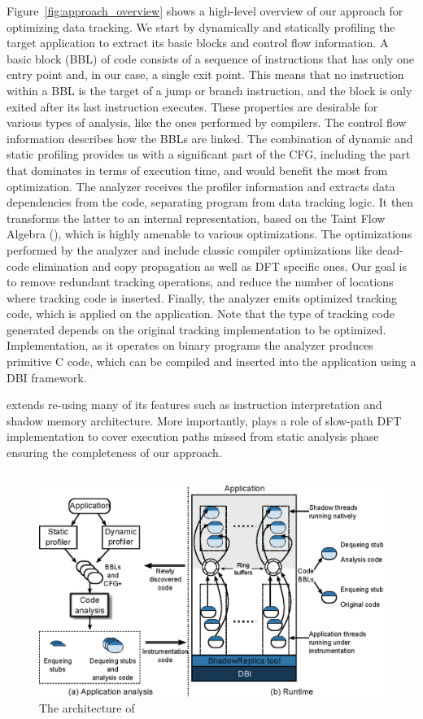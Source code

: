 Figure~\ref{fig:approach_overview} shows a high-level overview of our approach
for optimizing data tracking. We start by dynamically and statically profiling
the target application to extract its basic blocks and control flow
information. A basic block (BBL) of code consists of a sequence of instructions
that has only one entry point and, in our case, a single exit point. This means
that no instruction within a BBL is the target of a jump or branch instruction,
and the block is only exited after its last instruction executes. These
properties are desirable for various types of analysis, like the ones performed
by compilers. The control flow information describes how the BBLs are linked.
The combination of dynamic and static profiling provides us with a significant
part of the CFG, including the part that dominates in terms of execution time,
and would benefit the most from optimization.
%
The analyzer receives the profiler information and extracts data dependencies
from the code, separating program from data tracking logic. It then transforms
the latter to an internal representation, based on the Taint Flow Algebra
(\tfa), which is highly amenable to various optimizations. The optimizations
performed by the analyzer and include classic compiler optimizations like
dead-code elimination and copy propagation as well as DFT specific ones. Our
goal is to remove redundant tracking operations, and reduce the number of
locations where tracking code is inserted. 
%
Finally, the analyzer emits optimized tracking code, which is applied on the
application. Note that the type of tracking code generated depends on the
original tracking implementation to be optimized. Implementation, as it
operates on binary programs the analyzer produces primitive C code, which can
be compiled and inserted into the application using a DBI framework.

\tfa extends \libdft re-using many of its features such as instruction
interpretation and shadow memory architecture. More importantly, \libdft plays
a role of slow-path DFT implementation to cover execution paths missed from
static analysis phase ensuring the completeness of our approach.
 
\subsection{\sreplica}

\begin{figure}[tb]
    \centering
    \includegraphics[width=0.64\linewidth]{figs/architecture.eps}
    \caption{The architecture of \sreplica \label{fig:sreplica_arch}}
\end{figure}

